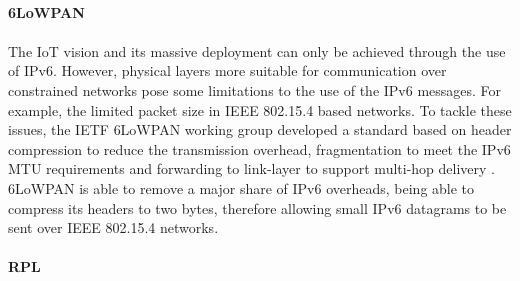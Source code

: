 \paragraph{\textbf{6LoWPAN}}
\paragraph{}
	The \ac{IoT} vision and its massive deployment can only be achieved through the use of IPv6. However, physical layers more suitable for communication over constrained networks pose some limitations to the use of the IPv6 messages. For example, the limited packet size in IEEE 802.15.4 based networks. To tackle these issues, the \ac{IETF} \ac{6LoWPAN} \cite{Shelby2012} working group developed a standard based on header compression to reduce the transmission overhead, fragmentation to meet the IPv6 \ac{MTU} requirements and forwarding to link-layer to support multi-hop delivery \cite{Hui2008}.
	\ac{6LoWPAN} is able to remove a major share of IPv6 overheads, being able to compress its headers to two bytes, therefore allowing small IPv6 datagrams to be sent over IEEE 802.15.4 networks. 
	
\paragraph{\textbf{RPL}}
